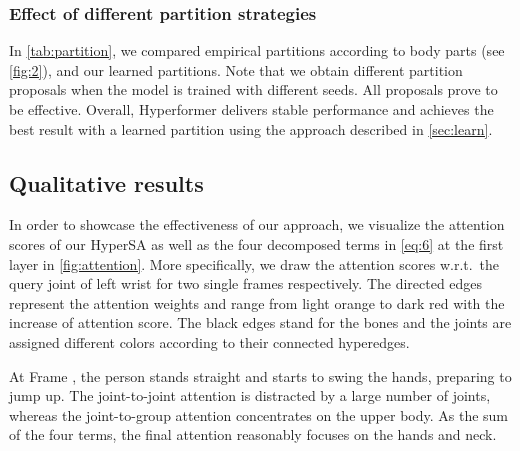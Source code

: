\documentclass[10pt,twocolumn,letterpaper]{article}
\begin{document}
\subsubsection{Effect of different partition strategies}
\begin{table}[h]
  \centering
  \caption{The effect of different partition strategies}
  \label{tab:partition}
    \end{table}
In \cref{tab:partition}, we compared empirical partitions according to body parts (see \cref{fig:2}), and our learned partitions. Note that we obtain different partition proposals when the model is trained with different seeds. All proposals prove to be effective.
Overall, Hyperformer delivers stable performance and achieves the best result with a learned partition using the approach described in \cref{sec:learn}.

\subsection{Qualitative results}
In order to showcase the effectiveness of our approach, we visualize the attention scores of our HyperSA as well as the four decomposed terms in \cref{eq:6} at the first layer in \cref{fig:attention}. More specifically, we draw the attention scores  w.r.t.~the query joint of left wrist for two single frames respectively. The directed edges represent the attention weights and range from light orange to dark red with the increase of attention score. The black edges stand for the bones and the joints are assigned different colors according to their connected hyperedges.  

At Frame , the person stands straight and starts to swing the hands, preparing to jump up. 
The joint-to-joint attention is distracted by a large number of joints, whereas the joint-to-group attention concentrates on the upper body. As the sum of the four terms, the final attention reasonably focuses on the hands and neck.
\end{document}
